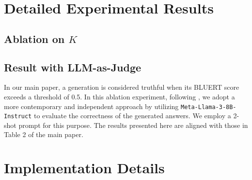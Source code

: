 \section{Detailed Experimental Results}
\subsection{Ablation on $K$}


\subsection{Result with LLM-as-Judge}


In our main paper, a generation is considered truthful when its BLUERT score exceeds a threshold of 0.5. In this ablation experiment, following \cite{xiong2024efficient}, we adopt a more contemporary and independent approach by utilizing \verb|Meta-Llama-3-8B-Instruct| to evaluate the correctness of the generated answers. We employ a 2-shot prompt for this purpose. The results presented here are aligned with those in Table 2 of the main paper.

\section{Implementation Details}
